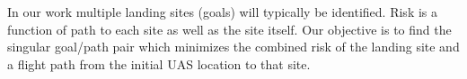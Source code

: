 In our work multiple landing sites (goals) will typically be identified. Risk is a function of path to each site as well as the site itself. Our objective is to find the singular goal/path pair which minimizes the combined risk of the landing site and a flight path from the initial \ac{UAS} location to that site. 

